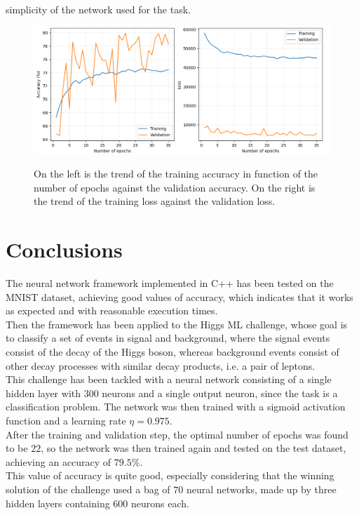 \documentclass[12pt]{article}
\begin{document}
simplicity of the network used for the task.
\begin{figure}
  \centering
  \includegraphics[scale=0.45]{./img/training_validation.png}
  \label{tv}
  \caption{On the left is the trend of the training accuracy in function of the number of epochs against the
  validation accuracy. On the right is the trend of the training loss against the validation loss.}
\end{figure}
\pagebreak

\section{Conclusions}
The neural network framework implemented in C++ has been tested on the MNIST dataset, achieving good values
of accuracy, which indicates that it works as expected and with reasonable execution times. \\
Then the framework has been applied to the Higgs ML challenge, whose goal is to classify a set of events
in signal and background, where the signal events consist of the decay of the Higgs boson, whereas 
background events consist of other decay processes with similar decay products, i.e. a pair of leptons. \\
This challenge has been tackled with a neural network consisting of a single hidden layer with $300$
neurons and a single output neuron, since the task is a classification problem. The network was then 
trained with a sigmoid activation function and a learning rate $\eta = 0.975$. \\
After the training and validation step, the optimal number of epochs was found to be $22$, so the network
was then trained again and tested on the test dataset, achieving an accuracy of $79.5 \%$. \\
This value of accuracy is quite good, especially considering that the winning solution of the challenge
used a bag of $70$ neural networks, made up by three hidden layers containing $600$ neurons each.
\end{document}
